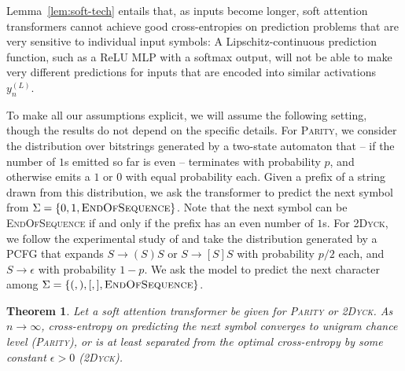 \documentclass[11pt,a4paper]{article}
\newcounter{theorem}
\newtheorem{thm}[theorem]{Theorem}
\begin{document}
Lemma~\ref{lem:soft-tech} entails that, as inputs become longer, soft attention transformers cannot achieve good cross-entropies on prediction problems that are very sensitive to individual input symbols:
A Lipschitz-continuous prediction function, such as a ReLU MLP with a softmax output, will not be able to make very different predictions for inputs that are encoded into similar activations $y_n^{(L)}$.

To make all our assumptions explicit, we will assume the following setting, though the results do not depend on the specific details.
For \textsc{Parity}, we consider the distribution over bitstrings generated by a two-state automaton that -- if the number of $1$s emitted so far is even -- terminates with probability $p$, and otherwise emits a $1$ or $0$ with equal probability each.
Given a prefix of a string drawn from this distribution, we ask the transformer to predict the next symbol from $\Sigma = \{0, 1, \textsc{EndOfSequence}\}$.
Note that the next symbol can be \textsc{EndOfSequence} if and only if the prefix has an even number of $1$s.
For \textsc{2Dyck}, we follow the experimental study of \citet{skachkova2018closing} and take the distribution generated by a PCFG that expands $S \rightarrow (S)S$ or $S \rightarrow [S]S$ with probability $p/2$ each, and $S \rightarrow \epsilon$ with probability $1-p$. %
We ask the model to predict the next character among $\Sigma = \{(,),[, ], \textsc{EndOfSequence}\}$.

\begin{thm}
Let a soft attention transformer be given for \textsc{Parity} or \textsc{2Dyck}.
As $n\rightarrow\infty$, cross-entropy on predicting the next symbol converges to unigram chance level (\textsc{Parity}), or is at least separated from the optimal cross-entropy by some constant $\epsilon >0$  (\textsc{2Dyck}).
\end{thm}
\end{document}
